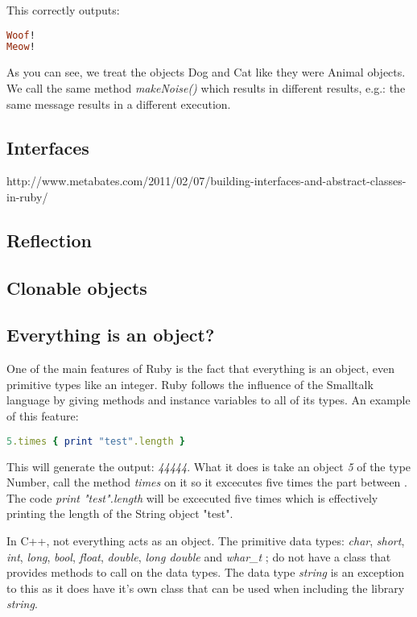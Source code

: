 \documentclass[10pt,a4paper,twocolumn]{article}
\begin{document}
This correctly outputs: 

\begin{lstlisting}[language=Ruby]
Woof!
Meow!
\end{lstlisting}

As you can see, we treat the objects Dog and Cat like they were Animal objects. We call the same method \textit{makeNoise()} which results in different results, e.g.: the same message results in a different execution.

\subsection{Interfaces}

http://www.metabates.com/2011/02/07/building-interfaces-and-abstract-classes-in-ruby/

\subsection{Reflection}

\subsection{Clonable objects}

\subsection{Everything is an object?}

One of the main features of Ruby is the fact that everything is an object, even primitive types like an integer. Ruby follows the influence of the Smalltalk language by giving methods and instance variables to all of its types. An example of this feature:

\begin{lstlisting}[language=Ruby]
5.times { print "test".length }
\end{lstlisting}

This will generate the output: \textit{44444}. What it does is take an object \textit{5} of the type Number, call the method \textit{times} on it so it excecutes five times the part between . The code \textit{print "test".length} will be excecuted five times which is effectively printing the length of the String object "test".

In C++, not everything acts as an object. The primitive data types: \textit{char}, \textit{short}, \textit{int}, \textit{long}, \textit{bool}, \textit{float}, \textit{double}, \textit{long double} and \textit{whar\_t} ; do not have a class that provides methods to call on the data types. The data type \textit{string} is an exception to this as it does have it's own class that can be used when including the library \textit{string}.
\end{document}
